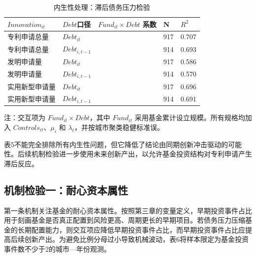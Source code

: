 \begin{table}[htbp]
  \centering
  \caption{内生性处理：滞后债务压力检验}
  {\ERJTableFont
  \begin{tabular}{@{}L{2.5cm} L{2.8cm} C{4.0cm} C{1.0cm} C{1.0cm}@{}}
    \toprule
    $Innovation_{it}$ & $Debt$口径 & $Fund_{it}\times Debt$ 系数 & N & $R^2$ \\
    \midrule
    专利申请总量 & $Debt_{it}$ &  & 917 & 0.707 \\
    专利申请总量 & $Debt_{i,t-1}$ &  & 914 & 0.693 \\
    发明申请量 & $Debt_{it}$ &  & 917 & 0.586 \\
    发明申请量 & $Debt_{i,t-1}$ &  & 914 & 0.570 \\
    实用新型申请量 & $Debt_{it}$ &  & 917 & 0.696 \\
    实用新型申请量 & $Debt_{i,t-1}$ &  & 914 & 0.691 \\
    \bottomrule
  \end{tabular}

  \par\smallskip
  {\ERJTableNoteFont 注：交互项为 $Fund_{it}\times Debt$，其中 $Fund_{it}$ 采用基金累计设立规模。所有规格均加入 $Controls_{it}$、$\mu_i$ 和 $\lambda_t$，并按城市聚类稳健标准误。}
  }
\end{table}

表5不能完全排除所有内生性问题，但它降低了结论由同期创新冲击驱动的可能性。后续机制检验进一步使用未来创新产出，以允许基金投资结构对专利申请产生滞后反应。

\subsection{机制检验一：耐心资本属性}

第一条机制关注基金的耐心资本属性。按照第三章的变量定义，早期投资事件占比用于刻画基金是否真正配置到风险更高、周期更长的早期项目。若债务压力压缩基金的长期配置能力，则交互项应降低早期投资事件占比，而早期投资事件占比应提高后续创新产出。为避免比例分母过小导致机械波动，表6将样本限定为基金投资事件数不少于2的城市—年份观测。

